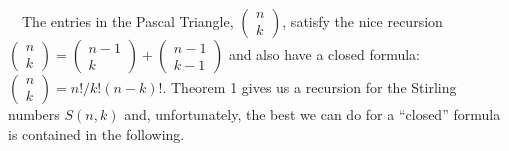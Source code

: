 \documentclass{article}
\begin{document}
\ \ The entries in the Pascal Triangle,  $\left(\begin{matrix}n\\k\end{matrix}\right)$, satisfy the nice recursion 
$\left(\begin{matrix}n\\k\end{matrix}\right)=\left(\begin{matrix}n-1\\k\end{matrix}\right)+\left(\begin{matrix}n-1\\k-1\end{matrix}\right)$
 and also have a closed formula:  $\left(\begin{matrix}n\\k\end{matrix}\right)=n!/k!\left(n-k\right)!$. Theorem 1 gives
us a recursion for the Stirling numbers  $S\left(n,k\right)$ and, unfortunately, the best we can do for a “closed”
formula is contained in the following. 
\end{document}

